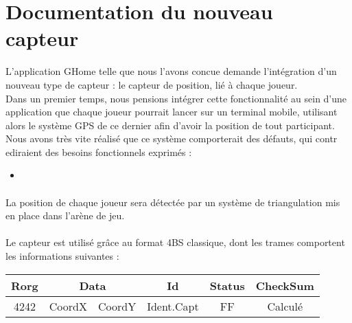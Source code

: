 \section{Documentation du nouveau capteur}

L'application GHome telle que nous l'avons concue demande l'intégration d'un nouveau type de capteur : le capteur de position, lié à chaque joueur.\\

Dans un premier temps, nous pensions intégrer cette fonctionnalité au sein d'une application que chaque joueur pourrait lancer sur un terminal mobile, utilisant alors le système GPS de ce dernier afin d'avoir la position de tout participant.\\
Nous avons très vite réalisé que ce système comporterait des défauts, qui contr
ediraient des besoins fonctionnels exprimés : 
\begin{itemize}
 \item 
\end{itemize}

\paragraph{}
La position de chaque joueur sera détectée par un système de triangulation mis en place dans l'arène de jeu.\\


\paragraph{}
Le capteur est utilisé grâce au format 4BS classique, dont les trames comportent les informations suivantes : 

\begin{center}
\begin{tabular}{|c|c|c|c|c|c|}
\hline
Rorg&\multicolumn{2}{|c|}{Data}&Id&Status&CheckSum\\
\hline
4242&CoordX&CoordY&Ident.Capt&FF&Calculé\\
\hline
\end{tabular}
\end{center}
 

